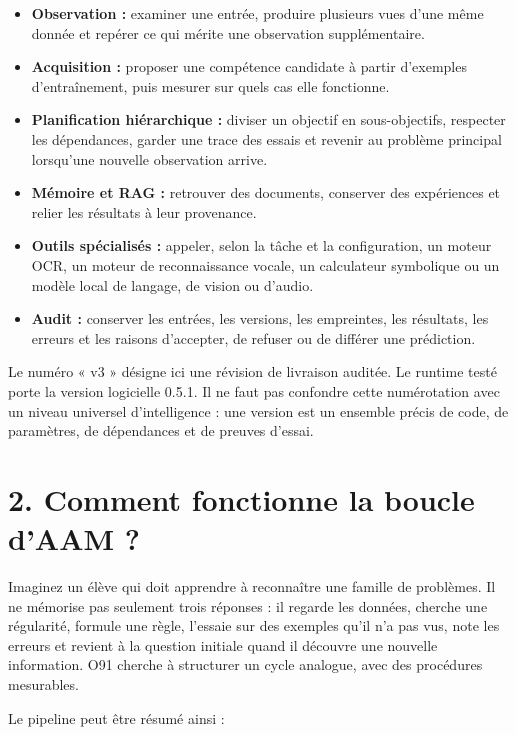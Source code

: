 \documentclass[11pt,a4paper]{article}
\begin{document}
\begin{itemize}
\item \textbf{Observation :} examiner une entrée, produire plusieurs vues d'une même donnée et repérer ce qui mérite une observation supplémentaire.
\item \textbf{Acquisition :} proposer une compétence candidate à partir d'exemples d'entraînement, puis mesurer sur quels cas elle fonctionne.
\item \textbf{Planification hiérarchique :} diviser un objectif en sous-objectifs, respecter les dépendances, garder une trace des essais et revenir au problème principal lorsqu'une nouvelle observation arrive.
\item \textbf{Mémoire et RAG :} retrouver des documents, conserver des expériences et relier les résultats à leur provenance.
\item \textbf{Outils spécialisés :} appeler, selon la tâche et la configuration, un moteur OCR, un moteur de reconnaissance vocale, un calculateur symbolique ou un modèle local de langage, de vision ou d'audio.
\item \textbf{Audit :} conserver les entrées, les versions, les empreintes, les résultats, les erreurs et les raisons d'accepter, de refuser ou de différer une prédiction.
\end{itemize}

Le numéro « v3 » désigne ici une révision de livraison auditée. Le runtime testé porte la version logicielle 0.5.1. Il ne faut pas confondre cette numérotation avec un niveau universel d'intelligence : une version est un ensemble précis de code, de paramètres, de dépendances et de preuves d'essai.

\section*{2. Comment fonctionne la boucle d'AAM ?}

Imaginez un élève qui doit apprendre à reconnaître une famille de problèmes. Il ne mémorise pas seulement trois réponses : il regarde les données, cherche une régularité, formule une règle, l'essaie sur des exemples qu'il n'a pas vus, note les erreurs et revient à la question initiale quand il découvre une nouvelle information. O91 cherche à structurer un cycle analogue, avec des procédures mesurables.

Le pipeline peut être résumé ainsi :
\end{document}
